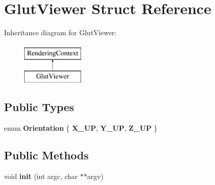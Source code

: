 \hypertarget{struct_glut_viewer}{}\section{Glut\+Viewer Struct Reference}
\label{struct_glut_viewer}
Inheritance diagram for Glut\+Viewer\+:\begin{figure}[H]
\begin{center}
\leavevmode
\includegraphics[height=2.000000cm]{struct_glut_viewer}
\end{center}
\end{figure}
\subsection*{Public Types}
\begin{DoxyCompactItemize}
\item 
\mbox{\label{struct_glut_viewer_aea31480390a568733169b60a83e3c8fc}} 
enum {\bfseries Orientation} \{ {\bfseries X\+\_\+\+UP}, 
{\bfseries Y\+\_\+\+UP}, 
{\bfseries Z\+\_\+\+UP}
 \}
\end{DoxyCompactItemize}
\subsection*{Public Methods}
\begin{DoxyCompactItemize}
\item 
\mbox{\label{struct_glut_viewer_ab49b8c33c56c472f42946c32a479a47d}} 
void {\bfseries init} (int argc, char $\ast$$\ast$argv)
\end{DoxyCompactItemize}
